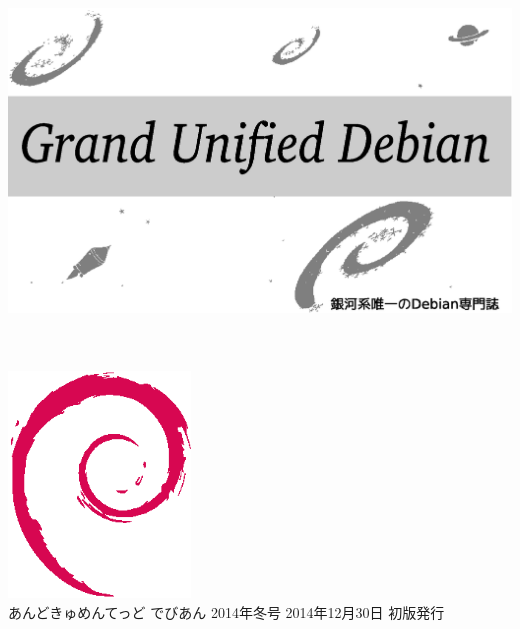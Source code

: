\documentclass[mingoth,a4paper]{jsarticle}
\begin{document}
\begin{titlepage}
\thispagestyle{empty}

\hspace*{-2.5cm}
\includegraphics{image2012-natsu/gudeb.eps}\\
\\
\\

\hspace*{11cm}\includegraphics[height=6cm]{image200502/openlogo-nd.eps}\\
\vspace*{0.1cm}
\hfill あんどきゅめんてっど でびあん 2014年冬号 2014年12月30日 初版発行
\end{titlepage}

\newpage
\thispagestyle{empty}\mbox{}
\newpage
\end{document}
